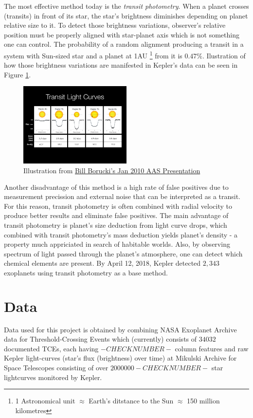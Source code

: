 \documentclass[twoside]{article}
\begin{document}
\begin{multicols}{2}
The most effective method today is the \textit{transit photometry}. When a planet crosses (transits) in front of its star, the star's brightness diminishes depending on planet relative size to it. To detect those brightness variations, observer's relative position must be properly aligned with star-planet axis which is not something one can control. The probability of a random alignment producing a transit in a system with Sun-sized star and a planet at 1AU \footnote{1 Astronomical unit $\approx$ Earth's ditstance to the Sun $\approx$ 150 million kilometres} from it is $0.47\%$. Ilustration of how those brightness variations are manifested in Kepler's data can be seen in Figure \ref{fig:kepler_curves}.
\begin{figure}[H]
\includegraphics[width=0.5\textwidth]{KeplerLightCurves}
\caption{Illustration from \href{https://www.nasa.gov/mission_pages/kepler/main/index.html?FuseAction=ShowNews&NewsID=16}{Bill Borucki's Jan 2010 AAS Presentation}}
\label{fig:kepler_curves}
\end{figure}
\noindent Another disadvantage of this method is a high rate of false positives due to measurement precission and external noise that can be interpreted as a transit. For this reason, transit photometry is often combined with radial velocity to produce better results and eliminate false positives. The main advantage of transit photometry is planet's size deduction from light curve drops, which combined with transit photometry's mass deduction yields planet's density - a property much appriciated in search of habitable worlds. Also, by observing spectrum of light passed through the planet's atmosphere, one can detect which chemical elements are present. By April 12, 2018, Kepler detected $2,343$ exoplanets using transit photometry as a base method.



\section{Data}
Data used for this project is obtained by combining NASA Exoplanet Archive data for Threshold-Crossing Events which (currently) consists of $34032$ documented TCEs, each having $-CHECKNUMBER-$ column features and raw Kepler light-curves (star's flux (brightness) over time) at Mikulski Archive for Space Telescopes consisting of over $2000000 -CHECKNUMBER-$ star lightcurves monitored by Kepler.


\end{multicols}
\end{document}
